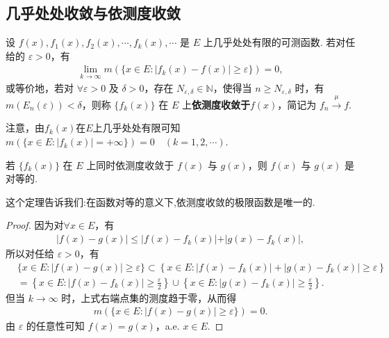 \documentclass[../../main.tex]{subfiles}
\begin{document}
\subsection{几乎处处收敛与依测度收敛}

\begin{definition}
设 $f(x),f_1(x),f_2(x),\cdots,f_k(x),\cdots$ 是 $E$ 上几乎处处有限的可测函数. 若对任给的 $\varepsilon>0$，有
\begin{align}
\lim_{k\to\infty}m(\{x\in E:\vert f_k(x)-f(x)\vert \geqslant \varepsilon\}) = 0,\label{eq:3.7}
\end{align}
或等价地，若对 $\forall\varepsilon > 0$ 及 $\delta > 0$，存在 $N_{\varepsilon,\delta}\in\mathbb{N}$，使得当 $n\geqslant N_{\varepsilon,\delta}$ 时，有 $m(E_n(\varepsilon)) < \delta$，则称 $\{f_k(x)\}$ 在 $E$ 上\textbf{依测度收敛于}$f(x)$，简记为 $f_n\stackrel{\mu}{\longrightarrow}f$. 
\end{definition}
\begin{remark}
注意，由$f_k(x)$在$E$上几乎处处有限可知$m(\{x\in E:\vert f_k(x)\vert=+\infty\}) = 0\quad (k = 1,2,\cdots)$. 
\end{remark}

\begin{theorem}\label{theorem:依测度收敛的极限函数必唯一}
若 $\{f_k(x)\}$ 在 $E$ 上同时依测度收敛于 $f(x)$ 与 $g(x)$，则 $f(x)$ 与 $g(x)$ 是对等的.
\end{theorem}
\begin{note}
这个定理告诉我们:在函数对等的意义下,依测度收敛的极限函数是唯一的.
\end{note}
\begin{proof}
因为对$\forall x\in E$，有
\begin{align*}
\vert f(x)-g(x)\vert\leqslant\vert f(x)-f_k(x)\vert+\vert g(x)-f_k(x)\vert,
\end{align*}
所以对任给 $\varepsilon>0$，有
\begin{align*}
&\{x\in E:\left| f(x)-g(x) \right|\geqslant \varepsilon \}\subset \left\{ x\in E:\left| f\left( x \right) -f_k\left( x \right) \right|+\left| g\left( x \right) -f_k\left( x \right) \right|\geqslant \varepsilon \right\} 
\\
&=\left\{ x\in E:\left| f(x)-f_k(x) \right|\geqslant \frac{\varepsilon}{2} \right\} \cup \left\{ x\in E:\left| g(x)-f_k(x) \right|\geqslant \frac{\varepsilon}{2} \right\} .
\end{align*}
但当 $k\to\infty$ 时，上式右端点集的测度趋于零，从而得
\begin{align*}
m(\{x\in E:\vert f(x)-g(x)\vert\geqslant \varepsilon\}) = 0.
\end{align*}
由 $\varepsilon$ 的任意性可知 $f(x)=g(x)$，a.e. $x\in E$. 
\end{proof}
\end{document}
